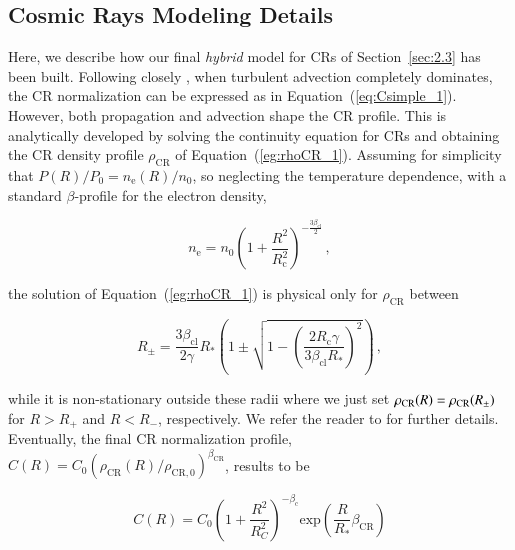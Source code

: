\documentclass[traditabstract]{aa}
\newcommand{\rmn}{\mathrm}
\begin{document}
\begin{appendix}

\section{Cosmic Rays Modeling Details}
\label{app:B}

Here, we describe how our final \emph{hybrid} model for CRs of Section~\ref{sec:2.3} has been built. 
Following closely \cite{2011A&A...527A..99E}, when turbulent advection
completely dominates, the CR normalization can be expressed as in 
Equation~(\ref{eq:Csimple_1}). However, both propagation and advection shape the 
CR profile. This is analytically developed by solving the continuity equation for CRs 
and obtaining the CR density profile $\rho_{\rmn{CR}}$ of Equation~(\ref{eg:rhoCR_1}). 
Assuming for simplicity that $P(R)/P_{0}=n_{\rmn{e}}(R)/n_{0}$, so neglecting the 
temperature dependence, with a standard $\beta$-profile for the electron density,

\begin{equation}
n_{\rmn{e}} = n_{0} \left( 1+\frac{R^{2}}{R_{\rmn{c}}^{2}} \right)^{-\frac{3\beta_{\rmn{cl}}}{2}} \, ,
\label{eq:beta_profile}
\end{equation} 

the solution of Equation~(\ref{eg:rhoCR_1}) is physical only for $\rho_{\rmn{CR}}$ between

\begin{equation}
R_{\pm} = \frac{3\beta_{\rmn{cl}}}{2\gamma}R_{*}\left(1\pm\sqrt{1-\left(\frac{2R_{\rmn{c}}\gamma}{3\beta_{\rmn{cl}}R_{*}}\right)^{2}}\right) \, ,
\label{eq:Rpm}
\end{equation} 

while it is non-stationary outside these radii where we just set $\rho_{\rmn{CR}}(R) = \rho_{\rm{CR}}(R_{\pm})$
for $R > R_{+}$ and $R < R_{-}$, respectively. We refer the reader to \cite{2011A&A...527A..99E} for 
further details. Eventually, the final CR normalization profile, 
$C(R)=C_{0}(\rho_{\rmn{CR}}(R)/\rho_{\rmn{CR},0})^{\beta_{\rmn{CR}}}$, results to be

\begin{equation}
C(R) = C_{0}\left( 1+ \frac{R^{2}}{R_{C}^{2}} \right)^{-\beta_{\rmn{c}}} \rmn{exp}\left( {\frac{R}{R_{*}}\beta_{\rmn{CR}}} \right)
\label{eq:Ctransport}
\end{equation} 


\end{appendix}
\end{document}
